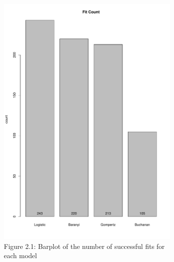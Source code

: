 \begin{figure}[h!]
    \centering
    \begin{subfigure}[h]{0.4\textwidth}
        \includegraphics[width=\textwidth]{../Results/Fit_count.pdf}
        \caption{Figure 2.1: Barplot of the number of successful fits for each model}
        \label{fig:Fit Count}
    \end{subfigure}
    \hfill
    \begin{subfigure}[h]{0.4\textwidth}

\end{subfigure}
\end{figure}
